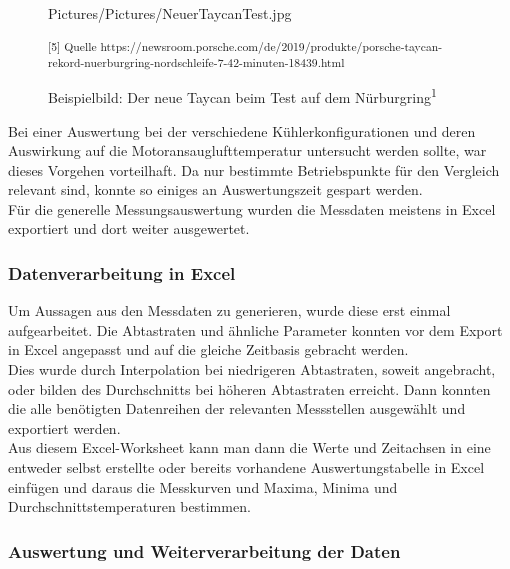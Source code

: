 \begin{figure}[h!]
	\begin{center}
		\begin{overpic}[width=\linewidth]{Pictures/Pictures/NeuerTaycanTest.jpg}
		
		\end{overpic}
		
		\caption{Beispielbild: Der neue Taycan beim Test auf dem Nürburgring\textsuperscript{1}}
		\small\textsuperscript{[5] Quelle https://newsroom.porsche.com/de/2019/produkte/porsche-taycan-rekord-nuerburgring-nordschleife-7-42-minuten-18439.html}
		\label{TaycanTest}
		
	\end{center}
\end{figure}

Bei einer Auswertung bei der verschiedene Kühlerkonfigurationen und deren Auswirkung auf die Motoransauglufttemperatur untersucht werden sollte, war dieses Vorgehen vorteilhaft. Da nur bestimmte Betriebspunkte für den Vergleich relevant sind, konnte so einiges an Auswertungszeit gespart werden.\\

Für die generelle Messungsauswertung wurden die Messdaten meistens in Excel exportiert und dort weiter ausgewertet.

\subsubsection{Datenverarbeitung in Excel}

Um Aussagen aus den Messdaten zu generieren, wurde diese erst einmal aufgearbeitet. Die Abtastraten und ähnliche Parameter konnten vor dem Export in Excel angepasst und auf die gleiche Zeitbasis gebracht werden. \\
Dies wurde durch Interpolation bei niedrigeren Abtastraten, soweit angebracht, oder bilden des Durchschnitts bei höheren Abtastraten erreicht. Dann konnten die alle benötigten Datenreihen der relevanten Messstellen ausgewählt und exportiert werden. \\

Aus diesem Excel-Worksheet kann man dann die Werte und Zeitachsen in eine entweder selbst erstellte oder bereits vorhandene Auswertungstabelle in Excel einfügen und daraus die Messkurven und Maxima, Minima und Durchschnittstemperaturen bestimmen.

\subsubsection{Auswertung und Weiterverarbeitung der Daten}

